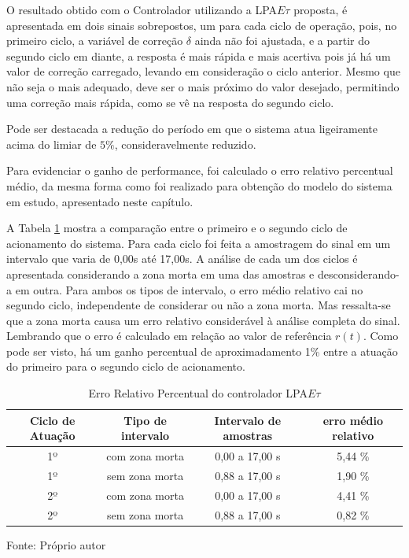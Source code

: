 
O resultado obtido com o Controlador utilizando a 
LPA$E\tau$ proposta, é apresentada em dois sinais sobrepostos,
um para cada ciclo de operação, 
pois, no primeiro ciclo, a variável de correção $\delta$
ainda não foi ajustada, e a partir do segundo ciclo em diante, 
a resposta é mais rápida e mais acertiva pois já há um
valor de correção carregado, 
levando em consideração o ciclo anterior. 
Mesmo que não seja o mais adequado, 
deve ser o mais próximo do valor desejado, 
permitindo uma correção mais rápida, 
como se vê na resposta do segundo ciclo.


Pode ser destacada a redução do período em que o sistema atua
ligeiramente acima do limiar de $5\%$, consideravelmente reduzido.


Para evidenciar o ganho de performance, 
foi calculado o erro relativo percentual médio,
da mesma forma como foi realizado para obtenção do modelo
do sistema em estudo, 
apresentado neste capítulo.

A Tabela \ref{tab:ErroLPAEt} mostra
a comparação entre o primeiro e o segundo ciclo de acionamento do
sistema. Para cada ciclo foi feita a amostragem do sinal em um
intervalo que varia de 0,00s até 17,00s. A análise de cada um dos ciclos é
apresentada considerando a zona morta em uma das amostras e
desconsiderando-a em outra. Para ambos os tipos de intervalo, o erro médio
relativo cai no segundo ciclo, independente de considerar ou não a
zona morta. Mas ressalta-se que a zona morta causa um erro relativo
considerável à análise completa do sinal. Lembrando que o erro é
calculado em relação ao valor de referência $r(t)$. 
Como pode ser visto, há um ganho percentual de 
aproximadamento 1\% entre a atuação do primeiro 
para o segundo ciclo de acionamento. 



\begin{table}[h]%
\centering
\caption{Erro Relativo Percentual do controlador LPA$E\tau$}
\label{tab:ErroLPAEt}

\begin{tabular}{c|c|c|c}
\hline
Ciclo de Atuação & Tipo de intervalo & Intervalo de amostras  &  erro médio relativo \\ \hline
\hline
1º & com zona morta & 0,00 a 17,00 s &  5,44 \% \\ \hline
1º & sem zona morta & 0,88 a 17,00 s &  1,90 \% \\ \hline
2º & com zona morta & 0,00 a 17,00 s &  4,41 \% \\ \hline
2º & sem zona morta & 0,88 a 17,00 s &  0,82 \% \\ \hline
\end{tabular}

{\vspace{0.2cm} \small Fonte: Próprio autor}
\end{table}



